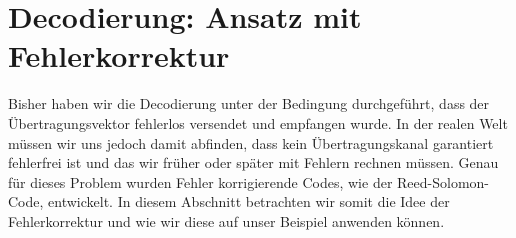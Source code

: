 %
%
%
\section{Decodierung: Ansatz mit Fehlerkorrektur
\label{reedsolomon:section:decmitfehler}}
Bisher haben wir die Decodierung unter der Bedingung durchgeführt, dass der Übertragungsvektor fehlerlos versendet und empfangen wurde.
In der realen Welt müssen wir uns jedoch damit abfinden, dass kein Übertragungskanal garantiert fehlerfrei ist und das wir früher oder später mit Fehlern rechnen müssen.
Genau für dieses Problem wurden Fehler korrigierende Codes, wie der Reed-Solomon-Code, entwickelt.
In diesem Abschnitt betrachten wir somit die Idee der Fehlerkorrektur und wie wir diese auf unser Beispiel anwenden können.

